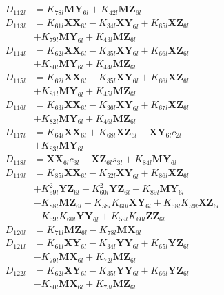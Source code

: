 \begin{align}
 \nonumber \\ 
D_{112l} &= K_{78l}\mathbf{MY}_{6l} + K_{42l}\mathbf{MZ}_{6l} \nonumber \\
D_{113l} &= K_{61l}\mathbf{XX}_{6l} - K_{34l}\mathbf{XY}_{6l} + K_{65l}\mathbf{XZ}_{6l}  \nonumber \\
&+ K_{79l}\mathbf{MY}_{6l} + K_{43l}\mathbf{MZ}_{6l} \nonumber \\
D_{114l} &= K_{62l}\mathbf{XX}_{6l} - K_{35l}\mathbf{XY}_{6l} + K_{66l}\mathbf{XZ}_{6l}  \nonumber \\
&+ K_{80l}\mathbf{MY}_{6l} + K_{44l}\mathbf{MZ}_{6l} \nonumber \\
D_{115l} &= K_{62l}\mathbf{XX}_{6l} - K_{35l}\mathbf{XY}_{6l} + K_{66l}\mathbf{XZ}_{6l}  \nonumber \\
&+ K_{81l}\mathbf{MY}_{6l} + K_{45l}\mathbf{MZ}_{6l} \nonumber \\
D_{116l} &= K_{63l}\mathbf{XX}_{6l} - K_{36l}\mathbf{XY}_{6l} + K_{67l}\mathbf{XZ}_{6l}  \nonumber \\
&+ K_{82l}\mathbf{MY}_{6l} + K_{46l}\mathbf{MZ}_{6l} \nonumber \\
D_{117l} &= K_{64l}\mathbf{XX}_{6l} + K_{68l}\mathbf{XZ}_{6l} - \mathbf{XY}_{6l}c_{2l}  \nonumber \\
&+ K_{83l}\mathbf{MY}_{6l} \nonumber \\
D_{118l} &= \mathbf{XX}_{6l}c_{3l} - \mathbf{XZ}_{6l}s_{3l} + K_{84l}\mathbf{MY}_{6l} \nonumber \\
D_{119l} &= K_{85l}\mathbf{XX}_{6l} - K_{52l}\mathbf{XY}_{6l} + K_{86l}\mathbf{XZ}_{6l}  \nonumber \\
&+ K_{59l}^2\mathbf{YZ}_{6l} - K_{60l}^2\mathbf{YZ}_{6l} + K_{89l}\mathbf{MY}_{6l}  \nonumber \\
&- K_{88l}\mathbf{MZ}_{6l} - K_{58l}K_{60l}\mathbf{XY}_{6l} + K_{58l}K_{59l}\mathbf{XZ}_{6l}  \nonumber \\
&- K_{59l}K_{60l}\mathbf{YY}_{6l} + K_{59l}K_{60l}\mathbf{ZZ}_{6l} \nonumber \\
D_{120l} &= K_{71l}\mathbf{MZ}_{6l} - K_{78l}\mathbf{MX}_{6l} \nonumber \\
D_{121l} &= K_{61l}\mathbf{XY}_{6l} - K_{34l}\mathbf{YY}_{6l} + K_{65l}\mathbf{YZ}_{6l}  \nonumber \\
&- K_{79l}\mathbf{MX}_{6l} + K_{72l}\mathbf{MZ}_{6l} \nonumber \\
D_{122l} &= K_{62l}\mathbf{XY}_{6l} - K_{35l}\mathbf{YY}_{6l} + K_{66l}\mathbf{YZ}_{6l}  \nonumber \\
&- K_{80l}\mathbf{MX}_{6l} + K_{73l}\mathbf{MZ}_{6l} \nonumber \\

\end{align}
